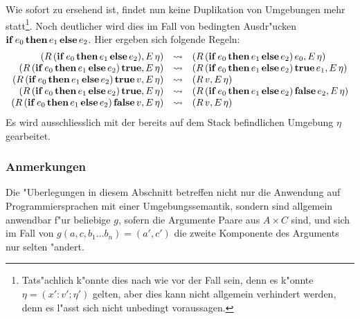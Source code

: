 \documentclass[12pt,a4paper,draft]{article}
\begin{document}
Wie sofort zu ersehend ist, findet nun keine Duplikation von Umgebungen mehr statt\footnote{Tats"achlich
k"onnte dies nach wie vor der Fall sein, denn es k"onnte $\eta = (x':v';\eta')$ gelten, aber dies kann
nicht allgemein verhindert werden, denn es l"asst sich nicht unbedingt voraussagen.}. Noch deutlicher
wird dies im Fall von bedingten Ausdr"ucken $\mathbf{if}\,{e_0}\,\mathbf{then}\,{e_1}\,\mathbf{else}\,{e_2}$. Hier ergeben sich folgende Regeln:
\[\begin{array}{rcl}
  (R\,(\mathbf{if}\,{e_0}\,\mathbf{then}\,{e_1}\,\mathbf{else}\,{e_2}),E\,\eta)
  &\rightsquigarrow& (R\,(\mathbf{if}\,{e_0}\,\mathbf{then}\,{e_1}\,\mathbf{else}\,{e_2})\,e_0,E\,\eta) \\
  (R\,(\mathbf{if}\,{e_0}\,\mathbf{then}\,{e_1}\,\mathbf{else}\,{e_2})\,\mathbf{true},E\,\eta)
  &\rightsquigarrow& (R\,(\mathbf{if}\,{e_0}\,\mathbf{then}\,{e_1}\,\mathbf{else}\,{e_2})\,\mathbf{true}\,e_1,E\,\eta) \\
  (R\,(\mathbf{if}\,{e_0}\,\mathbf{then}\,{e_1}\,\mathbf{else}\,{e_2})\,\mathbf{true}\,v,E\,\eta)
  &\rightsquigarrow& (R\,v,E\,\eta) \\
  (R\,(\mathbf{if}\,{e_0}\,\mathbf{then}\,{e_1}\,\mathbf{else}\,{e_2})\,\mathbf{true},E\,\eta)
  &\rightsquigarrow& (R\,(\mathbf{if}\,{e_0}\,\mathbf{then}\,{e_1}\,\mathbf{else}\,{e_2})\,\mathbf{false}\,e_2,E\,\eta) \\
  (R\,(\mathbf{if}\,{e_0}\,\mathbf{then}\,{e_1}\,\mathbf{else}\,{e_2})\,\mathbf{false}\,v,E\,\eta)
  &\rightsquigarrow& (R\,v,E\,\eta) \\
\end{array}\]
Es wird ausschliesslich mit der bereits auf dem Stack befindlichen Umgebung $\eta$ gearbeitet.


\subsubsection{Anmerkungen}

Die "Uberlegungen in diesem Abschnitt betreffen nicht nur die Anwendung auf Programmiersprachen mit einer
Umgebungssemantik, sondern sind allgemein anwendbar f"ur beliebige $g$, sofern die Argumente Paare aus
$A \times C$ sind, und sich im Fall von $g(a,c,b_1 \ldots b_n) = (a',c')$ die zweite Komponente des
Arguments nur selten "andert.
\end{document}
